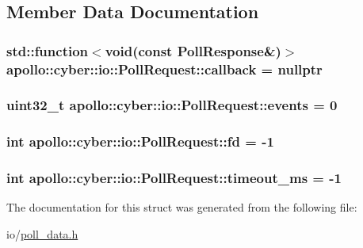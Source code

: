 \subsection{Member Data Documentation}
\hypertarget{structapollo_1_1cyber_1_1io_1_1PollRequest_a596e0d2d7684c2cc417374f4feabacdb}{
\subsubsection[{callback}]{\setlength{\rightskip}{0pt plus 5cm}std\-::function$<$void(const {\bf Poll\-Response}\&)$>$ apollo\-::cyber\-::io\-::\-Poll\-Request\-::callback = nullptr}}\label{structapollo_1_1cyber_1_1io_1_1PollRequest_a596e0d2d7684c2cc417374f4feabacdb}
\hypertarget{structapollo_1_1cyber_1_1io_1_1PollRequest_a9f3f5c8b8e95c755079f430f254d14c8}{
\subsubsection[{events}]{\setlength{\rightskip}{0pt plus 5cm}uint32\-\_\-t apollo\-::cyber\-::io\-::\-Poll\-Request\-::events = 0}}\label{structapollo_1_1cyber_1_1io_1_1PollRequest_a9f3f5c8b8e95c755079f430f254d14c8}
\hypertarget{structapollo_1_1cyber_1_1io_1_1PollRequest_ab3f2f7ba232afefcce9a9a8f398e2bf6}{
\subsubsection[{fd}]{\setlength{\rightskip}{0pt plus 5cm}int apollo\-::cyber\-::io\-::\-Poll\-Request\-::fd = -\/1}}\label{structapollo_1_1cyber_1_1io_1_1PollRequest_ab3f2f7ba232afefcce9a9a8f398e2bf6}
\hypertarget{structapollo_1_1cyber_1_1io_1_1PollRequest_ace3df86548fb7b6a99583c5abc1cccaa}{
\subsubsection[{timeout\-\_\-ms}]{\setlength{\rightskip}{0pt plus 5cm}int apollo\-::cyber\-::io\-::\-Poll\-Request\-::timeout\-\_\-ms = -\/1}}\label{structapollo_1_1cyber_1_1io_1_1PollRequest_ace3df86548fb7b6a99583c5abc1cccaa}


The documentation for this struct was generated from the following file\-:\begin{DoxyCompactItemize}
\item 
io/\hyperlink{poll__data_8h}{poll\-\_\-data.\-h}\end{DoxyCompactItemize}
